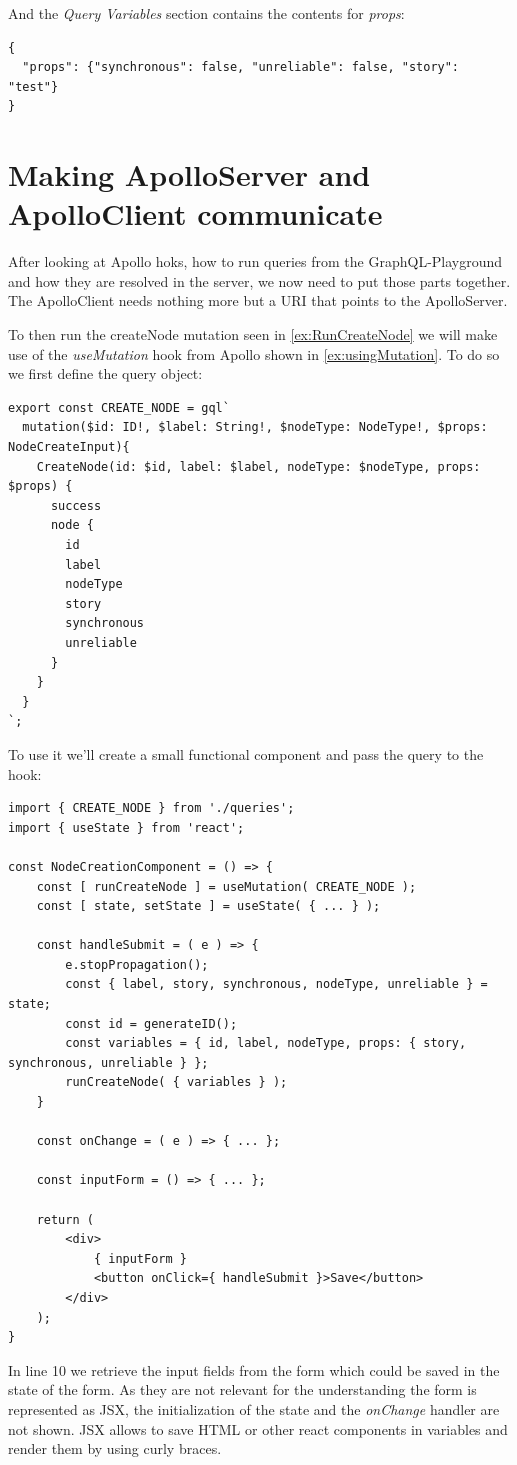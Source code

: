 And the \emph{Query Variables} section contains the contents for \emph{props}:
\begin{lstlisting}
{
  "props": {"synchronous": false, "unreliable": false, "story": "test"}
}
\end{lstlisting}

\section{Making ApolloServer and ApolloClient communicate}
After looking at Apollo hoks, how to run queries from the GraphQL-Playground and how they are resolved in the server, we now need to put those parts together. The ApolloClient needs nothing more but a URI that points to the ApolloServer.

To then run the createNode mutation seen in \autoref{ex:RunCreateNode} we will make use of the \emph{useMutation} hook from Apollo shown in \autoref{ex:usingMutation}. To do so we first define the query object:

\begin{lstlisting}[label={ex:DefQuery}]
export const CREATE_NODE = gql`
  mutation($id: ID!, $label: String!, $nodeType: NodeType!, $props: NodeCreateInput){
    CreateNode(id: $id, label: $label, nodeType: $nodeType, props: $props) {
      success
      node {
        id
        label
        nodeType
        story
        synchronous
        unreliable
      }
    }
  }
`;
\end{lstlisting}

To use it we'll create a small functional component and pass the query to the hook:

\begin{lstlisting}[caption={Using the Query in a Component}]
import { CREATE_NODE } from './queries';
import { useState } from 'react';

const NodeCreationComponent = () => {
	const [ runCreateNode ] = useMutation( CREATE_NODE );
	const [ state, setState ] = useState( { ... } );
	
	const handleSubmit = ( e ) => {
		e.stopPropagation();
		const { label, story, synchronous, nodeType, unreliable } = state; 
		const id = generateID();
		const variables = { id, label, nodeType, props: { story, synchronous, unreliable } }; 
		runCreateNode( { variables } );
	}

	const onChange = ( e ) => { ... };
	
	const inputForm = () => { ... };
	
	return (
		<div>
			{ inputForm }
			<button onClick={ handleSubmit }>Save</button>
		</div>	
	);
}
\end{lstlisting}
In line 10 we retrieve the input fields from the form which could be saved in the state of the form. As they are not relevant for the understanding the form is represented as JSX, the initialization of the state and the \emph{onChange} handler are not shown. JSX allows to save HTML or other react components in variables and render them by using curly braces.

